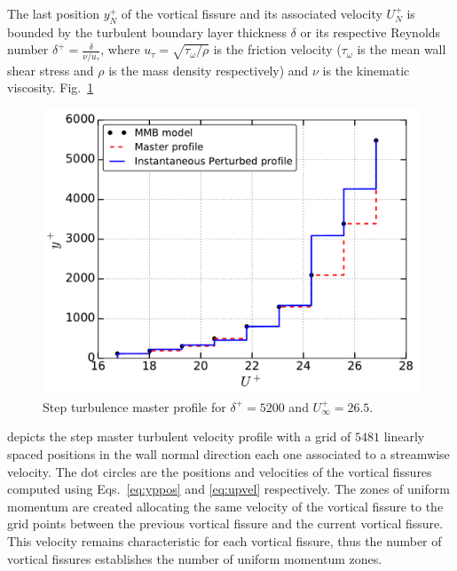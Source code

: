\documentclass[aps,reprint,amsmath,amssymb,prl]{revtex4-1}%
\begin{document}
The last position $y_{N}^+$ of the vortical fissure and its associated velocity $U^+_{N}$ is bounded by the turbulent boundary layer thickness $\delta$ or its respective Reynolds number $\delta^+=\frac{\delta}{\nu/u_{\tau}}$, where $u_{\tau}=\sqrt{\tau_{\omega}/\rho}$ is the friction velocity ($\tau_{\omega}$ is the mean wall shear stress and $\rho$ is the mass density respectively) and $\nu$ is the kinematic viscosity. 
Fig.~\ref{fig:master_profile} 
\begin{figure}[b]
\includegraphics[scale=0.46]{figures/Master_step_profile}
\caption{\label{fig:master_profile} Step turbulence master profile for $\delta^+=5200$ and $U^+_{\infty}=26.5$.}
\end{figure} 
depicts the step master turbulent velocity profile with a grid of $5481$ linearly spaced positions in the wall normal direction each one associated to a streamwise velocity. The dot circles are the positions and velocities of the vortical fissures computed using Eqs.~\ref{eq:yppos} and \ref{eq:upvel} respectively. The zones of uniform momentum are created allocating the same velocity of the vortical fissure to the grid points between the previous vortical fissure and the current vortical fissure. This velocity remains characteristic for each vortical fissure, thus the number of vortical fissures establishes the number of uniform momentum zones. \\
\end{document}
